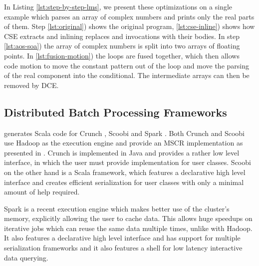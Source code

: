 In Listing \ref{lst:step-by-step-lms}, we present these optimizations on a
single example which parses an array of complex numbers and prints only the real parts of them.
Step \ref{lst:original}) shows the original program, \ref{lst:cse-inline}) shows
how CSE extracts  and inlining replaces  and 
invocations with their bodies. In step \ref{lst:aos-soa}) the array  of
complex numbers is split into two arrays of floating points.
In \ref{lst:fusion-motion}) the loops are fused together, which then allows code
motion to move the constant pattern out of the loop and move the parsing of the
real component into the conditional. The intermediate arrays can then be removed
by DCE.

\subsection{Distributed Batch Processing Frameworks}
\label{subsed:big-data-frameworks}
\tool generates Scala code for Crunch \cite{crunch}, Scoobi \cite{scoobi} and Spark \cite{spark-nsdi}. Both Crunch and Scoobi use Hadoop as the execution engine and provide an MSCR implementation as presented in \cite{chambers_flumejava:_2010}. Crunch is implemented in Java and provides a rather low level interface, in which the user must provide implementation for user classes. Scoobi on the other hand is a Scala framework, which features a declarative high level interface and creates efficient serialization for user classes with only a minimal amount of help required. 

Spark is a recent execution engine which makes better use of the cluster's
memory, explicitly allowing the user to cache data. This allows huge speedups on
iterative jobs which can reuse the same data multiple times, unlike with Hadoop.
It also features a declarative high level interface and has support for multiple
serialization frameworks and it also features a shell for low latency
interactive data querying.
